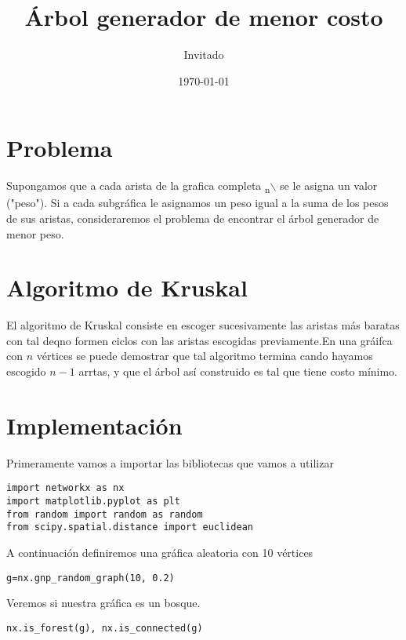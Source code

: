 \documentclass[11pt]{article}
\author{Invitado}
\date{\today}
\title{Árbol generador de menor costo}
\begin{document}
\maketitle

\section{Problema}
\label{sec:org67aee6c}

Supongamos que a cada arista de la grafica completa \K\textsubscript{n}$\backslash$ se le asigna un valor ("peso").
Si a cada subgráfica le asignamos un peso igual a la suma de los pesos de sus aristas, consideraremos 
el problema de encontrar el árbol generador de menor peso.

\section{Algoritmo de Kruskal}
\label{sec:org665b6ae}

El algoritmo de Kruskal consiste en escoger sucesivamente las aristas más baratas con tal deqno formen
 ciclos con las aristas escogidas previamente.En una gráifca con \(n\) vértices se puede demostrar que
tal algoritmo termina cando hayamos escogido \(n-1\) arrtas, y que el árbol así construido es tal que
tiene costo mínimo.

\section{Implementación}
\label{sec:org906ff51}

Primeramente vamos a importar las bibliotecas que vamos a utilizar 

\lstset{language=ipython,label= ,caption= ,captionpos=b,numbers=none}
\begin{lstlisting}
import networkx as nx
import matplotlib.pyplot as plt
from random import random as random
from scipy.spatial.distance import euclidean
\end{lstlisting}

A continuación definiremos una gráfica aleatoria con 10 vértices

\lstset{language=ipython,label= ,caption= ,captionpos=b,numbers=none}
\begin{lstlisting}
g=nx.gnp_random_graph(10, 0.2)
\end{lstlisting}

Veremos si nuestra gráfica es un bosque.

\lstset{language=ipython,label= ,caption= ,captionpos=b,numbers=none}
\begin{lstlisting}
nx.is_forest(g), nx.is_connected(g)
\end{lstlisting}
\end{document}
